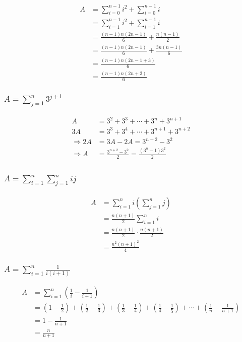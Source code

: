 \documentclass{article}
\begin{document}
\[
\begin{aligned}
A &= \sum_{i=0}^{n-1}i^2+\sum_{i=0}^{n-1}i \\
&= \sum_{i=1}^{n-1}i^2+\sum_{i=1}^{n-1}i \\
&= \frac{(n-1)n(2n-1)}{6}+\frac{n(n-1)}{2} \\
&= \frac{(n-1)n(2n-1)}{6} + \frac{3n(n-1)}{6} \\
&= \frac{(n-1)n(2n-1 + 3)}{6} \\
&= \frac{(n-1)n(2n+2)}{6}
\end{aligned}
\]

\subsubsection{$A=\sum_{j=1}^{n}3^{j+1}$}

\[
\begin{aligned}
A &= 3^2 + 3^3 + \cdots + 3^n + 3^{n+1} \\
3A &= 3^3 + 3^4 + \cdots + 3^{n+1} + 3^{n+2} \\
\Rightarrow{} 2A &= 3A - 2A = 3^{n+2}-3^2 \\
\Rightarrow{} A &= \frac{3^{n+2}-3^2}{2} = \frac{(3^n-1)3^2}{2} \\
\end{aligned}
\]

\subsubsection{$A=\sum_{i=1}^{n}\sum_{j=1}^{n}ij$}

\[
\begin{aligned}
A &= \sum_{i=1}^{n}i(\sum_{j=1}^{n}j) \\
&= \frac{n(n+1)}{2}\sum_{i=1}^{n}i \\
&= \frac{n(n+1)}{2}\cdot\frac{n(n+1)}{2} \\
&= \frac{n^2{(n+1)}^2}{4}
\end{aligned}
\]

\subsubsection{$A=\sum_{i=1}^{n}\frac{1}{i(i+1)}$}

\[
\begin{aligned}
A &= \sum_{i=1}^{n}(\frac{1}{i}-\frac{1}{i+1}) \\
&= (1-\frac{1}{2})+(\frac{1}{2}-\frac{1}{3})+(\frac{1}{3}-\frac{1}{4})+(\frac{1}{4}-\frac{1}{5})+\cdots+(\frac{1}{n}-\frac{1}{n+1}) \\
&= 1-\frac{1}{n+1} \\
&= \frac{n}{n+1}
\end{aligned}
\]
\end{document}
